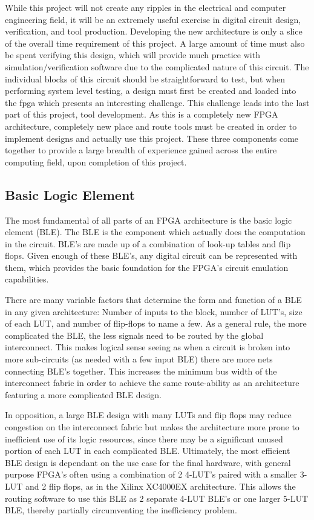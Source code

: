 \documentclass[12pt]{article}
\begin{document}
While this project will not create any ripples in the electrical and computer engineering 
field, it will be an extremely useful exercise in digital circuit design, verification,
and tool production. Developing the new architecture is only a slice of the overall 
time requirement of this project. A large amount of time must also be spent verifying 
this design, which will provide much practice with simulation/verification software 
due to the complicated nature of this circuit. The individual blocks of this circuit 
should be straightforward to test, but when performing system level testing, a design 
must first be created and loaded into the fpga which presents an interesting challenge.
This challenge leads into the last part of this project, tool development. As this 
is a completely new FPGA architecture, completely new place and route tools must 
be created in order to implement designs and actually use this project. These three 
components come together to provide a large breadth of experience gained across the 
entire computing field, upon completion of this project.

\subsection{Basic Logic Element}

The most fundamental of all parts of an FPGA architecture is the basic logic element 
(BLE). The BLE is the component which actually does the computation in the circuit.
BLE’s are made up of a combination of look-up tables and flip flops. Given enough 
of these BLE’s, any digital circuit can be represented with them, which provides the 
basic foundation for the FPGA’s circuit emulation capabilities.

There are many variable factors that determine the form and function of a BLE in 
any given architecture: Number of inputs to the block, number of LUT’s, size of each 
LUT, and number of flip-flops to name a few. As a general rule, the more complicated 
the BLE, the less signals need to be routed by the global interconnect. This makes 
logical sense seeing as when a circuit is broken into more sub-circuits (as needed 
with a few input BLE) there are more nets connecting BLE’s together. This increases 
the minimum bus width of the interconnect fabric in order to achieve the same route-ability 
as an architecture featuring a more complicated BLE design.

In opposition, a large BLE design with many LUTs and flip flops may reduce congestion 
on the interconnect fabric but makes the architecture more prone to inefficient use 
of its logic resources, since there may be a significant unused portion of each LUT 
in each complicated BLE. Ultimately, the most efficient BLE design is dependant on 
the use case for the final hardware, with general purpose FPGA’s often using a combination 
of 2 4-LUT’s paired with a smaller 3-LUT and 2 flip flops, as in the Xilinx XC4000EX 
architecture. This allows the routing software to use this BLE as 2 separate 4-LUT 
BLE’s or one larger 5-LUT BLE, thereby partially circumventing the inefficiency problem. 
\end{document}
